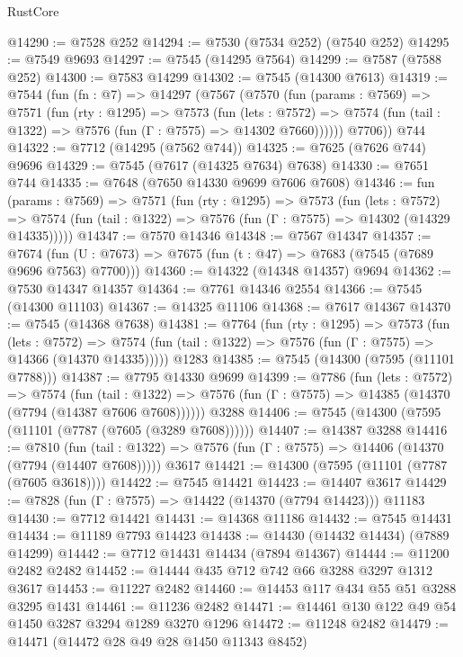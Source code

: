\begin{lexlean}{RustCore}
\begin{coremodule}
@14290 := @7528 @252
@14294 := @7530 (@7534 @252) (@7540 @252)
@14295 := @7549 @9693
@14297 := @7545 (@14295 @7564)
@14299 := @7587 (@7588 @252)
@14300 := @7583 @14299
@14302 := @7545 (@14300 @7613)
@14319 := @7544
    (fun (fn : @7) =>
    @14297
      (@7567
        (@7570
          (fun (params : @7569) =>
          @7571
            (fun (rty : @1295) =>
            @7573
              (fun (lets : @7572) =>
              @7574 (fun (tail : @1322) => @7576 (fun (Γ : @7575) => @14302 @7660))))))
        @7706))
    @744
@14322 := @7712 (@14295 (@7562 @744))
@14325 := @7625 (@7626 @744) @9696
@14329 := @7545 (@7617 (@14325 @7634) @7638)
@14330 := @7651 @744
@14335 := @7648 (@7650 @14330 @9699 @7606 @7608)
@14346 := fun (params : @7569) =>
  @7571
    (fun (rty : @1295) =>
    @7573
      (fun (lets : @7572) =>
      @7574 (fun (tail : @1322) => @7576 (fun (Γ : @7575) => @14302 (@14329 @14335)))))
@14347 := @7570 @14346
@14348 := @7567 @14347
@14357 := @7674
    (fun (U : @7673) => @7675 (fun (t : @47) => @7683 (@7545 (@7689 @9696 @7563) @7700)))
@14360 := @14322 (@14348 @14357) @9694
@14362 := @7530 @14347 @14357
@14364 := @7761 @14346 @2554
@14366 := @7545 (@14300 @11103)
@14367 := @14325 @11106
@14368 := @7617 @14367
@14370 := @7545 (@14368 @7638)
@14381 := @7764
    (fun (rty : @1295) =>
    @7573
      (fun (lets : @7572) =>
      @7574 (fun (tail : @1322) => @7576 (fun (Γ : @7575) => @14366 (@14370 @14335)))))
    @1283
@14385 := @7545 (@14300 (@7595 (@11101 @7788)))
@14387 := @7795 @14330 @9699
@14399 := @7786
    (fun (lets : @7572) =>
    @7574
      (fun (tail : @1322) =>
      @7576 (fun (Γ : @7575) => @14385 (@14370 (@7794 (@14387 @7606 @7608))))))
    @3288
@14406 := @7545 (@14300 (@7595 (@11101 (@7787 (@7605 (@3289 @7608))))))
@14407 := @14387 @3288
@14416 := @7810
    (fun (tail : @1322) => @7576 (fun (Γ : @7575) => @14406 (@14370 (@7794 (@14407 @7608)))))
    @3617
@14421 := @14300 (@7595 (@11101 (@7787 (@7605 @3618))))
@14422 := @7545 @14421
@14423 := @14407 @3617
@14429 := @7828 (fun (Γ : @7575) => @14422 (@14370 (@7794 @14423))) @11183
@14430 := @7712 @14421
@14431 := @14368 @11186
@14432 := @7545 @14431
@14434 := @11189 @7793 @14423
@14438 := @14430 (@14432 @14434) (@7889 @14299)
@14442 := @7712 @14431 @14434 (@7894 @14367)
@14444 := @11200 @2482 @2482
@14452 := @14444 @435 @712 @742 @66 @3288 @3297 @1312 @3617
@14453 := @11227 @2482
@14460 := @14453 @117 @434 @55 @51 @3288 @3295 @1431
@14461 := @11236 @2482
@14471 := @14461 @130 @122 @49 @54 @1450 @3287 @3294 @1289 @3270 @1296
@14472 := @11248 @2482
@14479 := @14471 (@14472 @28 @49 @28 @1450 @11343 @8452)

\end{coremodule}
\end{lexlean}
